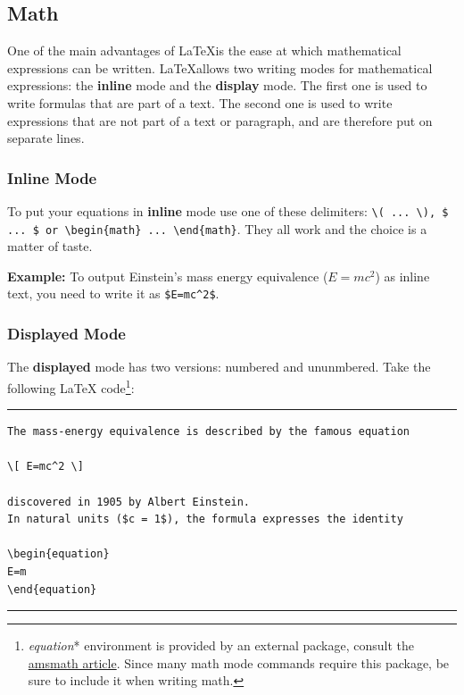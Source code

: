 \documentclass[12pt]{article}
\begin{document}
\subsection{Math}

One of the main advantages of \LaTeX is the ease at which mathematical expressions can be written. \LaTeX allows two writing modes for mathematical expressions: the \textbf{inline} mode and the \textbf{display} mode. The first one is used to write formulas that are part of a text. The second one is used to write expressions that are not part of a text or paragraph, and are therefore put on separate lines.\bigskip

\subsubsection{Inline Mode}

To put your equations in \textbf{inline} mode use one of these delimiters: \lstinline!\( ... \), $ ... $ or \begin{math} ... \end{math}!. They all work and the choice is a matter of taste.\bigskip

\textbf{Example:} To output Einstein's mass energy equivalence ($E=mc^2$) as inline text, you need to write it as \verb+$E=mc^2$+.\bigskip

\subsubsection{Displayed Mode}

The \textbf{displayed} mode has two versions: numbered and ununmbered. Take the following \LaTeX{} code\footnote{\textit{equation}* environment is provided by an external package, consult the \href{https://www.overleaf.com/learn/latex/Aligning\%20equations\%20with\%20amsmath}{amsmath article}. Since many math mode commands require this package, be sure to include it when writing math.}:\bigskip

\begin{minipage}{\linewidth}
\hrule

\begin{lstlisting}
The mass-energy equivalence is described by the famous equation

\[ E=mc^2 \]

discovered in 1905 by Albert Einstein. 
In natural units ($c = 1$), the formula expresses the identity

\begin{equation}
E=m
\end{equation}
\end{lstlisting}
\hrule
\end{minipage}
\bigskip
\end{document}
